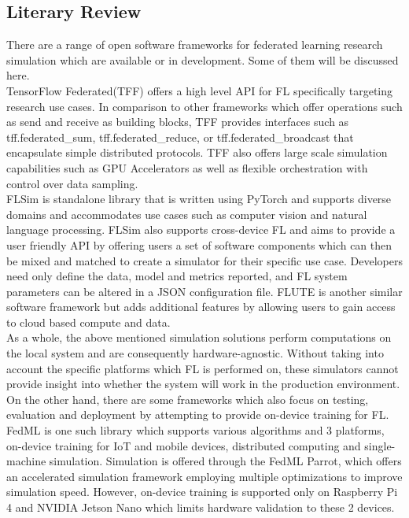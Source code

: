 \documentclass[12pt]{article}
\begin{document}
\subsection{Literary Review}
There are a range of open software frameworks for federated learning research simulation which are
available or in development. Some of them will be discussed here.\\

TensorFlow Federated(TFF)\cite{tff} offers a high level API for FL specifically targeting research use
cases. In comparison to other frameworks which offer operations such as send and receive as building
blocks, TFF provides interfaces such as tff.federated\_sum, tff.federated\_reduce, or
tff.federated\_broadcast that encapsulate simple distributed protocols. TFF also offers large scale
simulation capabilities such as GPU Accelerators as well as flexible orchestration with control over
data sampling.\\

FLSim\cite{li_2021_flsim} is standalone library that is written using PyTorch\cite{} and supports diverse
domains and accommodates use cases such as computer vision and natural language processing. FLSim
also supports cross-device FL and aims to provide a user friendly API by offering users a set
of software components which can then be mixed and matched to create a simulator for their specific use case. Developers need only
define the data, model and metrics reported, and FL system parameters can be altered in a JSON\cite{json}
configuration file. FLUTE\cite{garcia_2022_flute} is another similar software framework but adds additional features by allowing users to gain access to cloud based
compute and data.\\

As a whole, the above mentioned simulation solutions perform computations on the local system and are consequently hardware-agnostic. Without
taking into account the specific platforms which FL is performed on, these simulators cannot provide
insight into whether the system will work in the production environment.\\

On the other hand, there are some frameworks which also focus on testing, evaluation and deployment by
attempting to provide on-device training for FL.
FedML\cite{he_2020_fedml} is one such library which supports various algorithms and 3 platforms, on-device training for IoT and
mobile devices, distributed computing and single-machine simulation.
Simulation is offered through the FedML Parrot\cite{tang_2023_fedml}, which offers an accelerated simulation
framework employing multiple optimizations to improve simulation speed.
However, on-device training is supported only on Raspberry Pi 4 and NVIDIA Jetson Nano which limits
hardware validation to these 2 devices.\\
\end{document}
